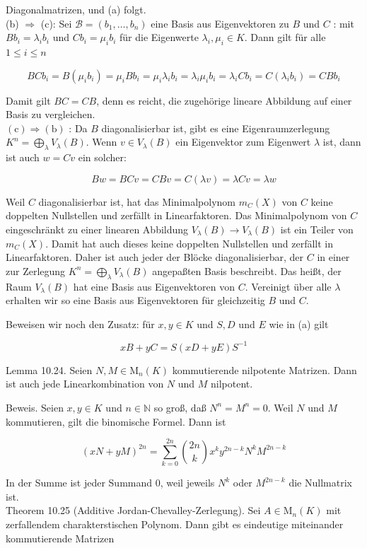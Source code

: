 \documentclass[10pt, letterpaper]{article}
\begin{document}
Diagonalmatrizen, und (a) folgt.\\
(b) $\Longrightarrow$ (c): Sei $\mathscr{B}=\left(b_{1}, \ldots, b_{n}\right)$ eine Basis aus Eigenvektoren zu $B$ und $C$ : mit $B b_{i}=\lambda_{i} b_{i}$ und $C b_{i}=\mu_{i} b_{i}$ für die Eigenwerte $\lambda_{i}, \mu_{i} \in K$. Dann gilt für alle $1 \leq i \leq n$

$$
B C b_{i}=B\left(\mu_{i} b_{i}\right)=\mu_{i} B b_{i}=\mu_{i} \lambda_{i} b_{i}=\lambda_{i} \mu_{i} b_{i}=\lambda_{i} C b_{i}=C\left(\lambda_{i} b_{i}\right)=C B b_{i}
$$

Damit gilt $B C=C B$, denn es reicht, die zugehörige lineare Abbildung auf einer Basis zu vergleichen.\\
$(\mathrm{c}) \Longrightarrow(\mathrm{b})$ : Da $B$ diagonalisierbar ist, gibt es eine Eigenraumzerlegung $K^{n}=\bigoplus_{\lambda} V_{\lambda}(B)$. Wenn $v \in V_{\lambda}(B)$ ein Eigenvektor zum Eigenwert $\lambda$ ist, dann ist auch $w=C v$ ein solcher:

$$
B w=B C v=C B v=C(\lambda v)=\lambda C v=\lambda w
$$

Weil $C$ diagonalisierbar ist, hat das Minimalpolynom $m_{C}(X)$ von $C$ keine doppelten Nullstellen und zerfällt in Linearfaktoren. Das Minimalpolynom von $C$ eingeschränkt zu einer linearen Abbildung $V_{\lambda}(B) \rightarrow V_{\lambda}(B)$ ist ein Teiler von $m_{C}(X)$. Damit hat auch dieses keine doppelten Nullstellen und zerfällt in Linearfaktoren. Daher ist auch jeder der Blöcke diagonalisierbar, der $C$ in einer zur Zerlegung $K^{n}=\bigoplus_{\lambda} V_{\lambda}(B)$ angepaßten Basis beschreibt. Das heißt, der Raum $V_{\lambda}(B)$ hat eine Basis aus Eigenvektoren von $C$. Vereinigt über alle $\lambda$ erhalten wir so eine Basis aus Eigenvektoren für gleichzeitig $B$ und $C$.

Beweisen wir noch den Zusatz: für $x, y \in K$ und $S, D$ und $E$ wie in (a) gilt

$$
x B+y C=S(x D+y E) S^{-1}
$$

Lemma 10.24. Seien $N, M \in \mathrm{M}_{n}(K)$ kommutierende nilpotente Matrizen. Dann ist auch jede Linearkombination von $N$ und $M$ nilpotent.

Beweis. Seien $x, y \in K$ und $n \in \mathbb{N}$ so groß, daß $N^{n}=M^{n}=0$. Weil $N$ und $M$ kommutieren, gilt die binomische Formel. Dann ist

$$
(x N+y M)^{2 n}=\sum_{k=0}^{2 n}\binom{2 n}{k} x^{k} y^{2 n-k} N^{k} M^{2 n-k}
$$

In der Summe ist jeder Summand 0, weil jeweils $N^{k}$ oder $M^{2 n-k}$ die Nullmatrix ist.\\
Theorem 10.25 (Additive Jordan-Chevalley-Zerlegung). Sei $A \in \mathrm{M}_{n}(K)$ mit zerfallendem charakterstischen Polynom. Dann gibt es eindeutige miteinander kommutierende Matrizen
\end{document}
